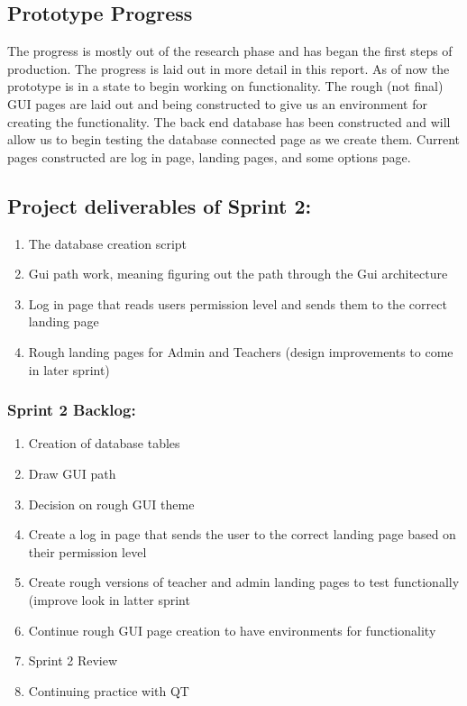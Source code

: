 \subsection{Prototype Progress}
The progress is mostly out of the research phase and has began the first steps of production. The progress is laid out in more detail in this report. As of now the prototype is in a state to begin working on functionality. The rough (not final) GUI pages are laid out and being constructed to give us an environment for creating the functionality. The back end database has been constructed and will allow us to begin testing the database connected page as we create them. Current pages constructed are log in page, landing pages, and some options page.

\subsection{Project deliverables of Sprint 2:}

\begin{enumerate}
\item The database creation script  
\item Gui path work, meaning figuring out the path through the Gui architecture 
\item Log in page that reads users permission level and sends them to the correct landing page
\item Rough landing pages for Admin and Teachers (design improvements to come in later sprint) 
\end{enumerate}


\subsubsection{Sprint 2 Backlog:}

\begin{enumerate}
\item Creation of database tables 
\item Draw GUI path
\item Decision on rough GUI theme
\item Create a log in page that sends the user to the correct landing page based on their permission level
\item Create rough versions of teacher and admin landing pages to test functionally (improve look in latter sprint 
\item Continue rough GUI page creation to have environments for functionality 
\item Sprint 2 Review
\item Continuing practice with QT
\end{enumerate}

